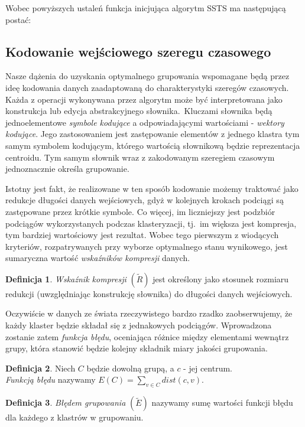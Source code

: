\documentclass{article}
\theoremstyle{definition}
\newtheorem{defn}{Definicja}
\begin{document}
Wobec powyższych ustaleń funkcja inicjująca algorytm SSTS ma następującą postać:



\subsection{Kodowanie wejściowego szeregu czasowego}

Nasze dążenia do uzyskania optymalnego grupowania wspomagane będą przez ideę kodowania danych zaadaptowaną do charakterystyki
szeregów czasowych. Każda z operacji wykonywana przez algorytm może być interpretowana jako konstrukcja lub edycja abstrakcyjnego słownika.~Kluczami słownika będą jednoelementowe \textit{symbole kodujące} a odpowiadającymi wartościami - \textit{wektory kodujące}. Jego zastosowaniem
jest zastępowanie elementów z jednego klastra tym samym symbolem kodującym, którego wartością słownikową będzie reprezentacja
centroidu. Tym samym słownik wraz z zakodowanym szeregiem czasowym jednoznacznie określa grupowanie.




Istotny jest fakt, że realizowane w ten sposób kodowanie możemy traktować jako redukcje długości danych wejściowych, 
gdyż w kolejnych krokach podciągi są zastępowane przez krótkie symbole. Co więcej, im liczniejszy jest podzbiór podciągów 
wykorzystanych podczas klasteryzacji, tj.~im większa jest kompresja, tym bardziej wartościowy jest rezultat.
Wobec tego pierwszym z wiodących kryteriów, rozpatrywanych przy wyborze optymalnego stanu wynikowego, jest sumaryczna wartość 
\textit{wskaźników kompresji} danych.

\begin{defn}
\textit{Wskaźnik kompresji} $(\tilde{R})$ jest określony jako stosunek rozmiaru redukcji (uwzględniając konstrukcję słownika) do długości danych wejściowych.
\end{defn}

Oczywiście w danych ze świata rzeczywistego bardzo rzadko zaobserwujemy, że każdy klaster będzie składał się z jednakowych podciągów.
Wprowadzona zostanie zatem \textit{funkcja błędu}, oceniająca różnice między elementami wewnątrz grupy, która stanowić będzie kolejny składnik 
miary jakości grupowania.

\begin{defn}
Niech $C$ będzie dowolną grupą, a $c$ - jej centrum.\\
\textit{Funkcją błędu} nazywamy $E(C) = \sum_{v \in C}{dist(c, v)}$.
\end{defn}
\begin{defn}
\textit{Błędem grupowania} $(\tilde{E})$ nazywamy sumę wartości funkcji błędu dla każdego z klastrów w grupowaniu.
\end{defn}
\end{document}
